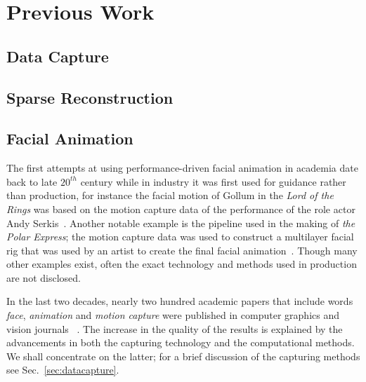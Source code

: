 \chapter{Previous Work}
\label{sec:previous}

\section{Data Capture}



\section{Sparse Reconstruction}


\section{Facial Animation} \label{sec:prfacialanimation}

The first attempts at using performance-driven facial animation in academia date back to late $20^{th}$ century while in industry it was first used for guidance rather than production, for instance the facial motion of Gollum in the \textit{Lord of the Rings} was based on the motion capture data of the performance of the role actor Andy Serkis~\cite{Pighin:2002}. Another notable example is the pipeline used in the making of \textit{the Polar Express}; the motion capture data was used to construct a multilayer facial rig that was used by an artist to create the final facial animation~\cite{Bennett:2005}. Though many other examples exist, often the exact technology and methods used in production are not disclosed. %

In the last two decades, nearly two hundred academic papers that include words \textit{face}, \textit{animation} and \textit{motion capture} were published in computer graphics and vision journals ~\cite{Scopus}. The increase in the quality of the results is explained by the advancements in both the capturing technology and the computational methods. We shall concentrate on the latter; for a brief discussion of the capturing methods see Sec.~\ref{sec:datacapture}. 

